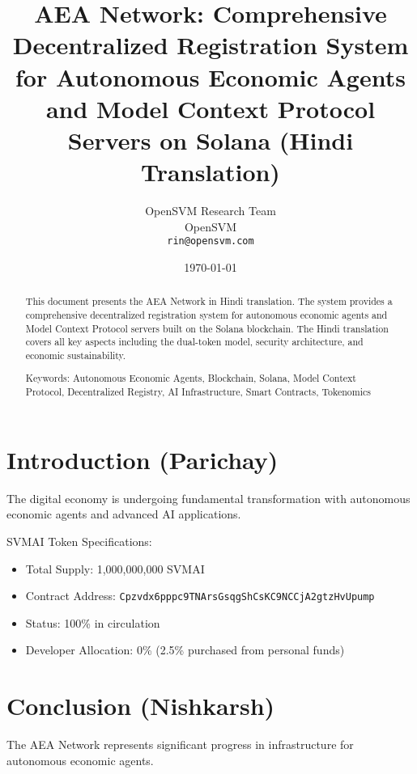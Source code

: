 \documentclass[12pt,a4paper]{article}
\title{AEA Network: Comprehensive Decentralized Registration System for Autonomous Economic Agents and Model Context Protocol Servers on Solana (Hindi Translation)}
\author{OpenSVM Research Team \\ OpenSVM \\ \texttt{rin@opensvm.com}}
\date{\today}
\begin{document}
\maketitle

\begin{abstract}
This document presents the AEA Network in Hindi translation. The system provides a comprehensive decentralized registration system for autonomous economic agents and Model Context Protocol servers built on the Solana blockchain. The Hindi translation covers all key aspects including the dual-token model, security architecture, and economic sustainability.

Keywords: Autonomous Economic Agents, Blockchain, Solana, Model Context Protocol, Decentralized Registry, AI Infrastructure, Smart Contracts, Tokenomics
\end{abstract}

\section{Introduction (Parichay)}
The digital economy is undergoing fundamental transformation with autonomous economic agents and advanced AI applications.

SVMAI Token Specifications:
\begin{itemize}
\item Total Supply: 1,000,000,000 SVMAI
\item Contract Address: \texttt{Cpzvdx6pppc9TNArsGsqgShCsKC9NCCjA2gtzHvUpump}
\item Status: 100\% in circulation
\item Developer Allocation: 0\% (2.5\% purchased from personal funds)
\end{itemize}

\section{Conclusion (Nishkarsh)}
The AEA Network represents significant progress in infrastructure for autonomous economic agents.
\end{document}
